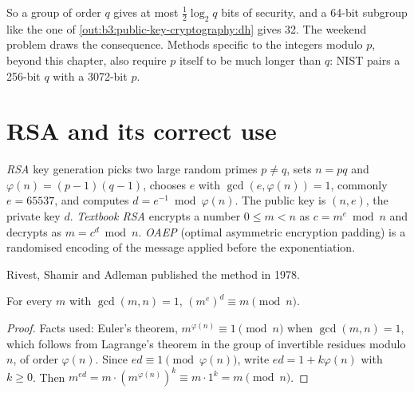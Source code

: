 \label{lst:b3:public-key-cryptography:bsgs}

\label{out:b3:public-key-cryptography:bsgs}

So a group of order $q$ gives at most $\frac{1}{2}\log_2 q$ bits of security, and a 64-bit subgroup like the one of \cref{out:b3:public-key-cryptography:dh} gives 32. The weekend problem draws the consequence. Methods specific to the integers modulo $p$, beyond this chapter, also require $p$ itself to be much longer than $q$: NIST pairs a 256-bit $q$ with a 3072-bit $p$. %

\section{RSA and its correct use}\label{sec:b3:public-key-cryptography:rsa}

\begin{definition}\label{def:b3:public-key-cryptography:rsa}
\emph{RSA} key generation picks two large random primes $p \ne q$, sets $n = pq$ and $\varphi(n) = (p - 1)(q - 1)$, chooses $e$ with $\gcd(e, \varphi(n)) = 1$, commonly $e = 65537$, and computes $d = e^{-1} \bmod \varphi(n)$. The public key is $(n, e)$, the private key $d$. \emph{Textbook RSA} encrypts a number $0 \le m < n$ as $c = m^e \bmod n$ and decrypts as $m = c^d \bmod n$. \emph{OAEP} (optimal asymmetric encryption padding) is a randomised encoding of the message applied before the exponentiation.
\end{definition}

Rivest, Shamir and Adleman published the method in 1978. %

\begin{theorem}\label{thm:b3:public-key-cryptography:rsa}
For every $m$ with $\gcd(m, n) = 1$, $(m^e)^d \equiv m \pmod{n}$.
\end{theorem}

\begin{proof}
Facts used: Euler's theorem, $m^{\varphi(n)} \equiv 1 \pmod n$ when $\gcd(m, n) = 1$, which follows from Lagrange's theorem in the group of invertible residues modulo $n$, of order $\varphi(n)$. Since $ed \equiv 1 \pmod{\varphi(n)}$, write $ed = 1 + k\varphi(n)$ with $k \ge 0$. Then $m^{ed} = m \cdot (m^{\varphi(n)})^k \equiv m \cdot 1^k = m \pmod n$.
\end{proof}

